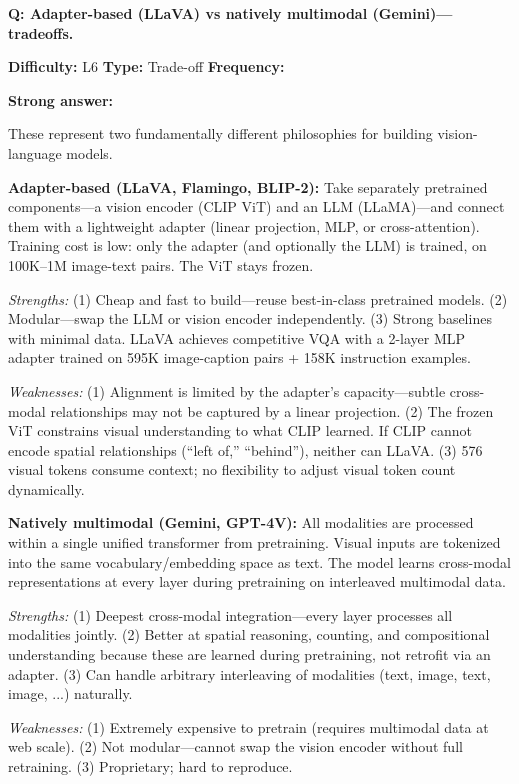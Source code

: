 
\begin{interviewq}
\textbf{Q: Adapter-based (LLaVA) vs natively multimodal (Gemini)---tradeoffs.}

\textbf{Difficulty:} L6 \quad \textbf{Type:} Trade-off \quad \textbf{Frequency:} \freqhigh{}

\textbf{Strong answer:}

These represent two fundamentally different philosophies for building vision-language models.

\textbf{Adapter-based (LLaVA, Flamingo, BLIP-2):} Take separately pretrained components---a vision encoder (CLIP ViT) and an LLM (LLaMA)---and connect them with a lightweight adapter (linear projection, MLP, or cross-attention). Training cost is low: only the adapter (and optionally the LLM) is trained, on 100K--1M image-text pairs. The ViT stays frozen.

\textit{Strengths:} (1) Cheap and fast to build---reuse best-in-class pretrained models. (2) Modular---swap the LLM or vision encoder independently. (3) Strong baselines with minimal data. LLaVA achieves competitive VQA with a 2-layer MLP adapter trained on 595K image-caption pairs + 158K instruction examples.

\textit{Weaknesses:} (1) Alignment is limited by the adapter's capacity---subtle cross-modal relationships may not be captured by a linear projection. (2) The frozen ViT constrains visual understanding to what CLIP learned. If CLIP cannot encode spatial relationships (``left of,'' ``behind''), neither can LLaVA. (3) 576 visual tokens consume context; no flexibility to adjust visual token count dynamically.

\textbf{Natively multimodal (Gemini, GPT-4V):} All modalities are processed within a single unified transformer from pretraining. Visual inputs are tokenized into the same vocabulary/embedding space as text. The model learns cross-modal representations at every layer during pretraining on interleaved multimodal data.

\textit{Strengths:} (1) Deepest cross-modal integration---every layer processes all modalities jointly. (2) Better at spatial reasoning, counting, and compositional understanding because these are learned during pretraining, not retrofit via an adapter. (3) Can handle arbitrary interleaving of modalities (text, image, text, image, ...) naturally.

\textit{Weaknesses:} (1) Extremely expensive to pretrain (requires multimodal data at web scale). (2) Not modular---cannot swap the vision encoder without full retraining. (3) Proprietary; hard to reproduce.


\end{interviewq}
